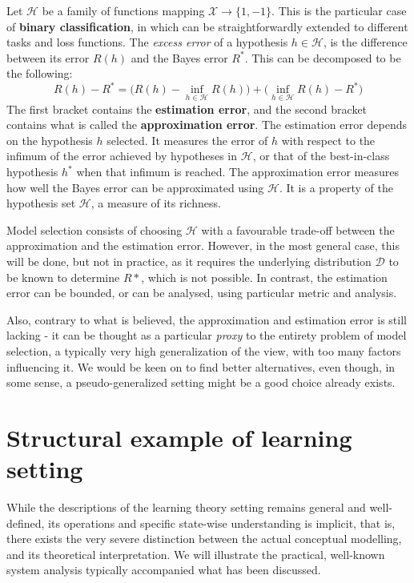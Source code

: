 Let $\mathcal{H}$ be a family of functions mapping $\mathcal{X}\to\{1,-1\}$. This is the particular case of \textbf{binary classification}, in which can be straightforwardly extended to different tasks and loss functions. The \textit{excess error} of a hypothesis $h\in\mathcal{H}$, is the difference between its error $R(h)$ and the Bayes error $R^{*}$. This can be decomposed to be the following: 
\begin{equation}
    R(h) - R^{*} = \Big( R(h) - \inf_{h\in \mathcal{H}} R(h) \Big) + \Big( \inf_{h\in \mathcal{H}} R(h) - R^{*} \Big)
\end{equation}
The first bracket contains the \textbf{estimation error}, and the second bracket contains what is called the \textbf{approximation error}. The estimation error depends on the hypothesis $h$ selected. It measures the error of $h$ with respect to the infimum of the error achieved by hypotheses in $\mathcal{H}$, or that of the best-in-class hypothesis $h^{*}$ when that infimum is reached. The approximation error measures how well the Bayes error can be approximated using $\mathcal{H}$. It is a property of the hypothesis set $\mathcal{H}$, a measure of its richness. 

Model selection consists of choosing $\mathcal{H}$ with a favourable trade-off between the approximation and the estimation error. However, in the most general case, this will be done, but not in practice, as it requires the underlying distribution $\mathcal{D}$ to be known to determine $R{*}$, which is not possible. In contrast, the estimation error can be bounded, or can be analysed, using particular metric and analysis. 

Also, contrary to what is believed, the approximation and estimation error is still lacking - it can be thought as a particular \textit{proxy} to the entirety problem of model selection, a typically very high generalization of the view, with too many factors influencing it. We would be keen on to find better alternatives, even though, in some sense, a pseudo-generalized setting might be a good choice already exists. 

\section{Structural example of learning setting}

While the descriptions of the learning theory setting remains general and well-defined, its operations and specific state-wise understanding is implicit, that is, there exists the very severe distinction between the actual conceptual modelling, and its theoretical interpretation. We will illustrate the practical, well-known system analysis typically accompanied what has been discussed. 

